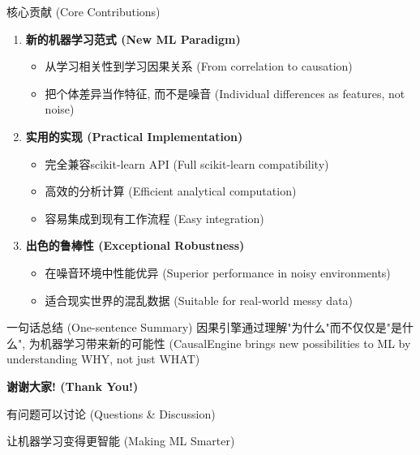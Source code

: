 \documentclass[aspectratio=169,12pt]{beamer}
\begin{document}
\begin{frame}{核心贡献 (Core Contributions)}
\begin{enumerate}
    \item \textbf{新的机器学习范式 (New ML Paradigm)}
    \begin{itemize}
        \item 从学习相关性到学习因果关系 (From correlation to causation)
        \item 把个体差异当作特征, 而不是噪音 (Individual differences as features, not noise)
    \end{itemize}
    
    \item \textbf{实用的实现 (Practical Implementation)}
    \begin{itemize}
        \item 完全兼容scikit-learn API (Full scikit-learn compatibility)
        \item 高效的分析计算 (Efficient analytical computation)
        \item 容易集成到现有工作流程 (Easy integration)
    \end{itemize}
    
    \item \textbf{出色的鲁棒性 (Exceptional Robustness)}
    \begin{itemize}
        \item 在噪音环境中性能优异 (Superior performance in noisy environments)
        \item 适合现实世界的混乱数据 (Suitable for real-world messy data)
    \end{itemize}
\end{enumerate}

\vspace{1em}
\begin{block}{一句话总结 (One-sentence Summary)}
因果引擎通过理解"为什么"而不仅仅是"是什么", 为机器学习带来新的可能性 (CausalEngine brings new possibilities to ML by understanding WHY, not just WHAT)
\end{block}
\end{frame}

\begin{frame}
\begin{center}
{\Huge \textbf{谢谢大家! (Thank You!)}}

\vspace{2em}

{\Large 有问题可以讨论 (Questions \& Discussion)}

\vspace{2em}

{\large 让机器学习变得更智能 (Making ML Smarter) 🚀}
\end{center}
\end{frame}
\end{document}
